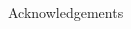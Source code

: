 
\begin{frame}{Acknowledgements}
  \begin{columns}
    \begin{column}{.425\textwidth}
      \minipage[c][0.65\textheight][s]{\columnwidth}
      
      
      
      \endminipage      
    \end{column}
    \begin{column}{.575\textwidth}
      
      
    \end{column}
  \end{columns}
  
\end{frame}
